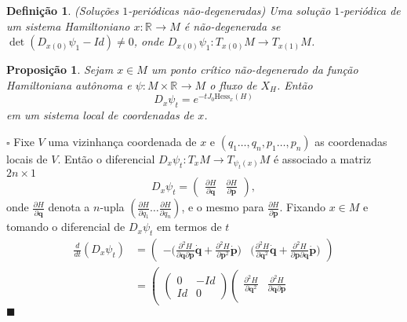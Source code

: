\documentclass[12pt]{book}
\newtheorem{definicao}[teorema]{Definição}
\newtheorem{proposicao}[teorema]{Proposição}
\newenvironment{prova}[1]{$\square$ #1}{\hfill$\blacksquare$}
\newcommand{\campohamiltonianoabrev}{X_{H}}
\newcommand{\derivada}[2]{\frac{d #1}{d #2}}
\newcommand{\derivadaparcial}[2]{\frac{\partial #1}{\partial #2}}
\newcommand{\derivadaparcialdois}[2]{\frac{\partial^{2} #1}{\partial #2^{2}}}
\newcommand{\derivadaparcialdoisdois}[3]{\frac{\partial^{2} #1}{\partial #2 \partial#3}}
\newcommand{\espacotangenteponto}[2]{T_{#1}#2}
\newcommand{\estruturacomplexa}{J_{0}}
\newcommand{\hessianaponto}[2]{\text{Hess}_{#1}(#2)}
\newcommand{\real}[1]{\mathbb{R}^{#1}}
\newcommand{\reta}{\real{}}
\begin{document}
	\begin{definicao}(Soluções $1$-periódicas não-degeneradas)
		Uma solução $1$-periódica de um sistema Hamiltoniano $x: \reta\to M$ é não-degenerada se $\det(D_{x(0)}\psi_{1} - Id)\neq 0$, onde $D_{x(0)}\psi_{1}:T_{x(0)}M \to T_{x(1)}M$.
	\end{definicao}
	
	\begin{proposicao}\label{proposicao_exponencial_hessiana}
		Sejam $x \in M$ um ponto crítico não-degenerado da função Hamiltoniana autônoma e $\psi:M\times \reta\to M$ o fluxo de $\campohamiltonianoabrev$. Então 
		$$
		D_{x}\psi_{t} = e^{-t\estruturacomplexa \hessianaponto{x}{H}}
		$$
		em um sistema local de coordenadas de $x$.
	\end{proposicao}
	\begin{prova}
		Fixe $V$ uma vizinhança coordenada de $x$ e  $(q_{1}\dots, q_{n}, p_{1}\dots, p_{n})$ as coordenadas locais de $V$. Então o diferencial $D_{x}\psi_{t}:\espacotangenteponto{x}{M} \to \espacotangenteponto{\psi_{t}(x)}{M}$ é associado a matriz $2n\times 1$
		$$
		D_{x}\psi_{t} = 
		\left(
		\begin{array}{cc}
		\derivadaparcial{H}{\textbf{q}} &\derivadaparcial{H}{\textbf{p}}
		\end{array}
		\right),
		$$
		onde $\derivadaparcial{H}{\textbf{q}}$ denota a $n$-upla $(	\derivadaparcial{H}{q_{1}} \dots \derivadaparcial{H}{q_{n}})$, e o mesmo para $\derivadaparcial{H}{\textbf{p}}$. Fixando $x\in M$ e tomando o diferencial de $D_{x}\psi_{t}$ em termos de $t$
		$$
		\begin{aligned}
		\derivada{}{t}(D_{x}\psi_{t})
		&=
		\left(
		\begin{array}{cc}
		-\big(\derivadaparcialdoisdois{H}{\textbf{q}}{\textbf{p}}\dot{\textbf{q}}+\derivadaparcialdois{H}{\textbf{p}}\dot{\textbf{p}} \big) & 
		\big(\derivadaparcialdois{H}{\textbf{q}}\dot{\textbf{q}}+\derivadaparcialdoisdois{H}{\textbf{p}}{\textbf{q}}\dot{\textbf{p}} \big)
		\end{array}
		\right)
		\\
		&=
		\left(
		\begin{array}{c}
		\left(
		\begin{array}{cc}
		0& -Id
		\\
		Id & 0
		\end{array}
		\right)
		\left(
		\begin{array}{cc}
		\derivadaparcialdois{H}{\textbf{q}} & 
		\derivadaparcialdoisdois{H}{\textbf{q}}{\textbf{p}}
		\\

\end{array}
\end{array}
\end{aligned}$$
\end{prova}
\end{document}
